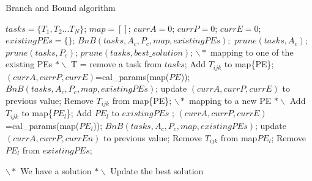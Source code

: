 \begin{algorithm}
\caption{Branch and Bound algorithm}\label{BnB}
\begin{algorithmic}[1]
\State \begin{math} tasks = \lbrace T_1, T_2 ... T_N \rbrace \end{math};
\State $map = [ ]$; 
\State $currA = 0$; 
\State $currP = 0$; 
\State $currE = 0$; 
\State $existingPEs = \{\}$; 
\State
\State $BnB(tasks, A_c, P_c, map, existingPEs);$
\State
{}
\State
\State $prune(tasks, A_c)$; 
\State $prune(tasks, P_c)$;
\State $prune(tasks, best\_solution)$; 
\State
{}  
\State $\backslash\ast$ mapping to one of the existing PEs $\ast\backslash$
\State T = remove a task from $tasks$;
\State
{} 
 
\State Add $T_{ijk}$ to map\{PE\};
\State $(currA, currP, currE)$=cal\_params(map($PE$));
\State
{} 
\State $BnB(tasks, A_c, P_c, map, existingPEs)$;
\Else
\State update $(currA, currP, currE)$ to previous value;
\State Remove $T_{ijk}$ from map\{PE\};
\EndIf
\EndFor
\EndFor
\EndFor
\State
\State $\backslash\ast$ mapping to a new PE $\ast\backslash$
 
 
  
\State Add $T_{ijk}$ to map\{$PE_{l}$\};
\State Add $PE_{l}$ to $existingPEs$ ;
\State $(currA, currP, currE)$=cal\_params(map($PE_{l}$));
\State
{} 
\State $BnB(tasks, A_c, P_c, map, existingPEs)$;
\Else
\State update $(currA, currP, currEn)$ to previous value;
\State Remove $T_{ijk}$ from map{$PE_{l}$};
\State Remove $PE_{l}$ from $existingPEs$;
\EndIf
\EndFor
\EndFor
\EndFor
\State

\Else 
\State $\backslash\ast$ We have a solution $\ast\backslash$
\State Update the best solution
 \EndIf
\State
\EndProcedure
\end{algorithmic}
\end{algorithm}
   